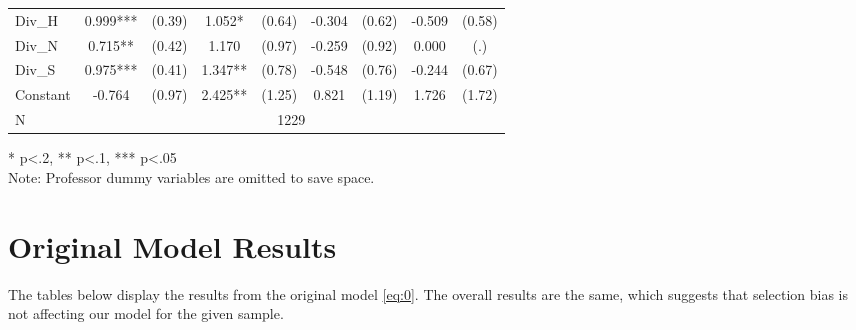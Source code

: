 \begin{sidewaystable}[htb]
\begin{threeparttable}
\begin{tabular}{l|c|c|c|c|c|c|c|c}
      Div\_H            & 0.999***                     & (0.39)                       & 1.052*                      & (0.64)               & -0.304               & (0.62)               & -0.509               & (0.58)               \\
      Div\_N            & 0.715**                      & (0.42)                       & 1.170                       & (0.97)               & -0.259               & (0.92)               & 0.000                & (.)                  \\
      Div\_S            & 0.975***                     & (0.41)                       & 1.347**                     & (0.78)               & -0.548               & (0.76)               & -0.244               & (0.67)               \\
      Constant          & -0.764                       & (0.97)                       & 2.425**                     & (1.25)               & 0.821                & (1.19)               & 1.726                & (1.72)               \\      
      \hline
      N & \multicolumn{8}{|c}{1229} \\
      \hline
      \hline
    \end{tabular}
    \begin{tablenotes}
    \item{* p<.2, ** p<.1, *** p<.05 \\ Note: Professor dummy variables are omitted to save space.}
    \end{tablenotes}
  \end{threeparttable}
\end{sidewaystable}

\clearpage{}

\restoregeometry{}

\section{Original Model Results}\label{appendix:c}

The tables below display the results from the original model \eqref{eq:0}. 
The overall results are the same, which suggests that selection bias is not affecting our model for the given sample.

